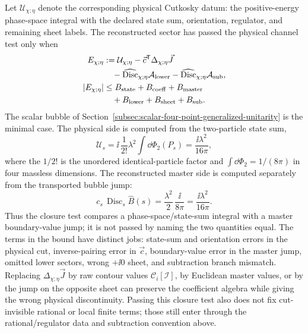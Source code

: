 \begin{controlledapproximation}
Let \(\mathcal U_{\chi;\eta}\) denote the corresponding physical Cutkosky
datum: the positive-energy phase-space integral with the declared state sum,
orientation, regulator, and remaining sheet labels.  The reconstructed sector
has passed the physical channel test only when
\begin{equation}
  \begin{aligned}
  E_{\chi;\eta}
  &:=
  \mathcal U_{\chi;\eta}
  -
  \vec c^{\mathsf T}\Delta_{\chi;\eta}\vec J\\
  &\quad
  -
  \widehat{\operatorname{Disc}}_{\chi;\eta}\mathcal A_{\rm lower}
  -
  \widehat{\operatorname{Disc}}_{\chi;\eta}\mathcal A_{\rm sub},\\
  |E_{\chi;\eta}|
  &\le
  B_{\rm state}+B_{\rm coeff}+B_{\rm master}\\
  &\quad
  +B_{\rm lower}+B_{\rm sheet}+B_{\rm sub}.
\end{aligned}
  \label{eq:master-discontinuity-closure-bound}
\end{equation}
The scalar bubble of
Section~\ref{subsec:scalar-four-point-generalized-unitarity} is the minimal
case.  The physical side is computed from the two-particle state sum,
\[
  \mathcal U_s
  =
  \ii\,\frac{1}{2!}\lambda^2
  \int \dd\Phi_2(P_s)
  =
  \frac{\ii\lambda^2}{16\pi},
\]
where the \(1/2!\) is the unordered identical-particle factor and
\(\int\dd\Phi_2=1/(8\pi)\) in four massless dimensions.  The reconstructed
master side is computed separately from the transported bubble jump:
\[
  c_s\,\operatorname{Disc}_s\widehat B(s)
  =
  \frac{\lambda^2}{2}\,
  \frac{\ii}{8\pi}
  =
  \frac{\ii\lambda^2}{16\pi}.
\]
Thus the closure test compares a phase-space/state-sum integral with a master
boundary-value jump; it is not passed by naming the two quantities equal.
The terms in the bound have distinct jobs: state-sum and orientation errors in
the physical cut, inverse-pairing error in \(\vec c\), boundary-value error in
the master jump, omitted lower sectors, wrong \(+\ii0\) sheet, and subtraction
branch mismatch.  Replacing \(\Delta_{\chi;\eta}\vec J\) by raw contour values
\(\mathcal C_i[\mathcal I]\), by Euclidean master values, or by the jump on the
opposite sheet can preserve the coefficient algebra while giving the wrong
physical discontinuity.  Passing this closure test also does not fix
cut-invisible rational or local finite terms; those still enter through the
rational/regulator data and subtraction convention above.
\end{controlledapproximation}

